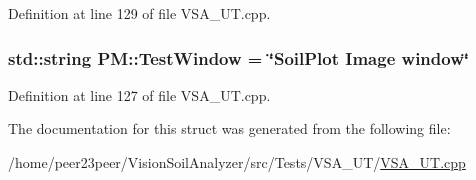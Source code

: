 Definition at line 129 of file V\+S\+A\+\_\+\+U\+T.\+cpp.

\hypertarget{struct_p_m_a2141a6fa1189cc201abe78a3a8613bd9}{}
\subsubsection[{Test\+Window}]{\setlength{\rightskip}{0pt plus 5cm}std\+::string P\+M\+::\+Test\+Window = \char`\"{}Soil\+Plot Image window\char`\"{}}\label{struct_p_m_a2141a6fa1189cc201abe78a3a8613bd9}


Definition at line 127 of file V\+S\+A\+\_\+\+U\+T.\+cpp.



The documentation for this struct was generated from the following file\+:\begin{DoxyCompactItemize}
\item 
/home/peer23peer/\+Vision\+Soil\+Analyzer/src/\+Tests/\+V\+S\+A\+\_\+\+U\+T/\hyperlink{_v_s_a___u_t_8cpp}{V\+S\+A\+\_\+\+U\+T.\+cpp}\end{DoxyCompactItemize}

